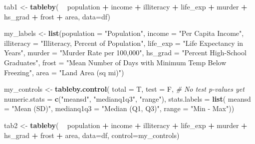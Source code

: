 \documentclass[]{article}
\newenvironment{Shaded}{\begin{snugshade}}{\end{snugshade}}
\newcommand{\CommentTok}[1]{\textcolor[rgb]{0.56,0.35,0.01}{\textit{#1}}}
\newcommand{\DataTypeTok}[1]{\textcolor[rgb]{0.13,0.29,0.53}{#1}}
\newcommand{\KeywordTok}[1]{\textcolor[rgb]{0.13,0.29,0.53}{\textbf{#1}}}
\newcommand{\NormalTok}[1]{#1}
\newcommand{\OperatorTok}[1]{\textcolor[rgb]{0.81,0.36,0.00}{\textbf{#1}}}
\newcommand{\StringTok}[1]{\textcolor[rgb]{0.31,0.60,0.02}{#1}}
\begin{document}
\begin{Shaded}
\begin{Highlighting}[]
\NormalTok{tab1 <-}\StringTok{ }\KeywordTok{tableby}\NormalTok{( }\OperatorTok{~}\StringTok{ }\NormalTok{population }\OperatorTok{+}\StringTok{ }\NormalTok{income }\OperatorTok{+}\StringTok{ }\NormalTok{illiteracy }\OperatorTok{+}\StringTok{ }\NormalTok{life_exp }\OperatorTok{+}\StringTok{ }\NormalTok{murder }\OperatorTok{+}\StringTok{ }\NormalTok{hs_grad }\OperatorTok{+}\StringTok{ }\NormalTok{frost }\OperatorTok{+}\StringTok{ }\NormalTok{area, }\DataTypeTok{data=}\NormalTok{df)}

\NormalTok{my_labels <-}\StringTok{ }\KeywordTok{list}\NormalTok{(}\DataTypeTok{population =} \StringTok{"Population"}\NormalTok{, }
                  \DataTypeTok{income =} \StringTok{"Per Capita Income"}\NormalTok{, }
                  \DataTypeTok{illiteracy =} \StringTok{"Illiteracy, Percent of Population"}\NormalTok{, }
                  \DataTypeTok{life_exp =} \StringTok{"Life Expectancy in Years"}\NormalTok{, }
                  \DataTypeTok{murder =} \StringTok{"Murder Rate per 100,000"}\NormalTok{, }
                  \DataTypeTok{hs_grad =} \StringTok{"Percent High-School Graduates"}\NormalTok{, }
                  \DataTypeTok{frost =} \StringTok{"Mean Number of Days with Minimum Temp Below Freezing"}\NormalTok{, }
                  \DataTypeTok{area =} \StringTok{"Land Area (sq mi)"}\NormalTok{)}

\NormalTok{my_controls <-}\StringTok{ }\KeywordTok{tableby.control}\NormalTok{(}
               \DataTypeTok{total =}\NormalTok{ T,}
               \DataTypeTok{test =}\NormalTok{ F,  }\CommentTok{# No test p-values yet}
               \DataTypeTok{numeric.stats =} \KeywordTok{c}\NormalTok{(}\StringTok{"meansd"}\NormalTok{, }\StringTok{"medianq1q3"}\NormalTok{, }\StringTok{"range"}\NormalTok{),}
               \DataTypeTok{stats.labels =} \KeywordTok{list}\NormalTok{(}
               \DataTypeTok{meansd =} \StringTok{"Mean (SD)"}\NormalTok{,}
               \DataTypeTok{medianq1q3 =} \StringTok{"Median (Q1, Q3)"}\NormalTok{,}
               \DataTypeTok{range =} \StringTok{"Min - Max"}\NormalTok{))}

\NormalTok{tab2 <-}\StringTok{ }\KeywordTok{tableby}\NormalTok{( }\OperatorTok{~}\StringTok{ }\NormalTok{population }\OperatorTok{+}\StringTok{ }\NormalTok{income }\OperatorTok{+}\StringTok{ }\NormalTok{illiteracy }\OperatorTok{+}\StringTok{ }\NormalTok{life_exp }\OperatorTok{+}\StringTok{ }\NormalTok{murder }\OperatorTok{+}\StringTok{ }\NormalTok{hs_grad }\OperatorTok{+}\StringTok{ }\NormalTok{frost }\OperatorTok{+}\StringTok{ }\NormalTok{area, }\DataTypeTok{data=}\NormalTok{df, }\DataTypeTok{control=}\NormalTok{my_controls)}


\end{Highlighting}
\end{Shaded}
\end{document}
